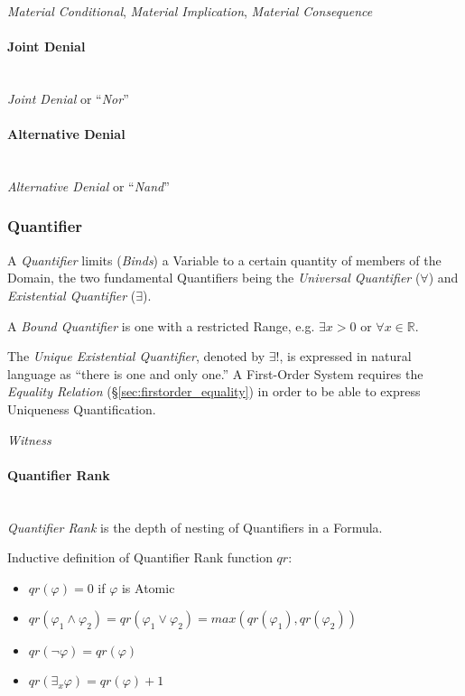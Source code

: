 \emph{Material Conditional}, \emph{Material Implication},
\emph{Material Consequence}



\paragraph{Joint Denial}\label{sec:joint_denial}\hfill \\

\emph{Joint Denial} or ``\emph{Nor}''



\paragraph{Alternative Denial}\label{sec:alternative_denial}\hfill \\

\emph{Alternative Denial} or ``\emph{Nand}''



\subsubsection{Quantifier}\label{sec:quantifier}

A \emph{Quantifier} limits (\emph{Binds}) a Variable to a certain
quantity of members of the Domain, the two fundamental Quantifiers
being the \emph{Universal Quantifier} ($\forall$) and
\emph{Existential Quantifier} ($\exists$).

A \emph{Bound Quantifier} is one with a restricted Range, e.g.
$\exists x > 0$ or $\forall x \in \mathbb{R}$.

The \emph{Unique Existential Quantifier}, denoted by $\exists !$, is
expressed in natural language as ``there is one and only one.'' A
First-Order System requires the \emph{Equality Relation}
(\S\ref{sec:firstorder_equality}) in order to be able to express
Uniqueness Quantification.

\emph{Witness}



\paragraph{Quantifier Rank}\label{sec:quantifier_rank}\hfill \\

\emph{Quantifier Rank} is the depth of nesting of Quantifiers in a
Formula.

Inductive definition of Quantifier Rank function $qr$:
\begin{itemize}
\item $qr(\varphi) = 0$ if $\varphi$ is Atomic
\item $qr(\varphi_1 \wedge \varphi_2) = qr(\varphi_1 \vee \varphi_2) = max(qr(\varphi_1),qr(\varphi_2))$
\item $qr(\neg \varphi) = qr(\varphi)$
\item $qr(\exists_x \varphi) = qr(\varphi) + 1$
\end{itemize}



